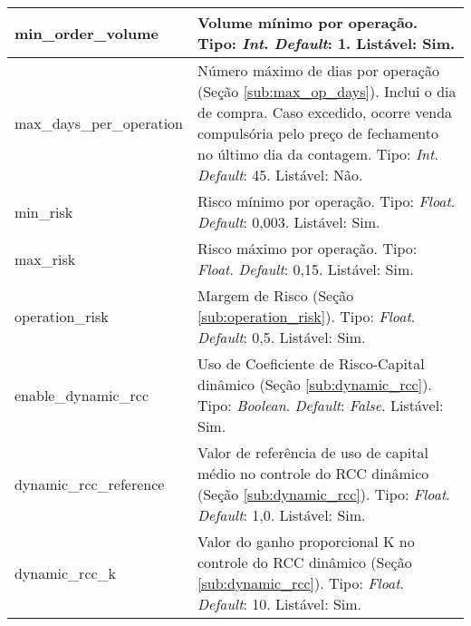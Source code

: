 \begin{center}
{\begin{longtable}[m]{| m{11em} | m{21em} |}
        \hline
        min\_order\_volume & Volume mínimo por operação. Tipo: \textit{Int}. \textit{Default}: 1. Listável: Sim. \\
        \hline
        max\_days\_per\_operation & Número máximo de dias por operação (Seção \ref{sub:max_op_days}). Inclui o dia de compra. Caso excedido, ocorre venda compulsória pelo preço de fechamento no último dia da contagem. Tipo: \textit{Int}. \textit{Default}: 45. Listável: Não. \\
        \hline
        min\_risk & Risco mínimo por operação. Tipo: \textit{Float}. \textit{Default}: 0,003. Listável: Sim. \\
        \hline
        max\_risk & Risco máximo por operação. Tipo: \textit{Float}. \textit{Default}: 0,15. Listável: Sim. \\
        \hline
        operation\_risk & Margem de Risco (Seção \ref{sub:operation_risk}). Tipo: \textit{Float}. \textit{Default}: 0,5. Listável: Sim. \\
        \hline
        enable\_dynamic\_rcc & Uso de Coeficiente de Risco-Capital dinâmico (Seção \ref{sub:dynamic_rcc}). Tipo: \textit{Boolean}. \textit{Default}: \textit{False}. Listável: Sim. \\
        \hline
        dynamic\_rcc\_reference & Valor de referência de uso de capital médio no controle do RCC dinâmico (Seção \ref{sub:dynamic_rcc}). Tipo: \textit{Float}. \textit{Default}: 1,0. Listável: Sim. \\
        \hline
        dynamic\_rcc\_k & Valor do ganho proporcional K no controle do RCC dinâmico (Seção \ref{sub:dynamic_rcc}). Tipo: \textit{Float}. \textit{Default}: 10. Listável: Sim. \\
        \hline


\end{longtable}}
\end{center}
